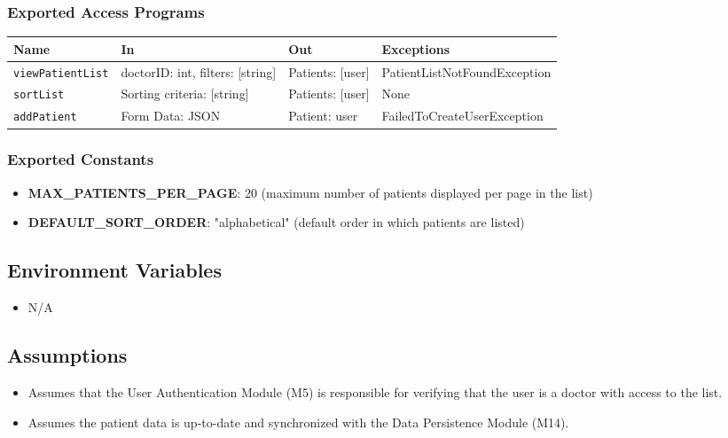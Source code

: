 \documentclass[12pt, titlepage]{article}
\begin{document}
\subsubsection{Exported Access Programs}
\begin{center}
  \renewcommand{\arraystretch}{1.2}
  \begin{tabularx}{\textwidth}{|l|X|X|l|}
    \hline
    \textbf{Name} & \textbf{In} & \textbf{Out} & \textbf{Exceptions} \\
    \hline 
    \texttt{viewPatientList} & doctorID: int, filters: [string] & Patients: [user] & PatientListNotFoundException \\
    \hline
    \texttt{sortList} & Sorting criteria: [string] & Patients: [user] & None \\
    \hline
    \texttt{addPatient} & Form Data: JSON & Patient: user & FailedToCreateUserException \\
    \hline
  \end{tabularx}
\end{center}

\subsubsection{Exported Constants}
\begin{itemize}
\item \textbf{MAX\_PATIENTS\_PER\_PAGE}: 20 (maximum number of patients displayed per page in the list)
\item \textbf{DEFAULT\_SORT\_ORDER}: "alphabetical" (default order in which patients are listed)
\end{itemize}

\subsection{Environment Variables}
\begin{itemize}
\item N/A
\end{itemize}

\subsection{Assumptions}
\begin{itemize}
\item Assumes that the User Authentication Module (M5) is responsible for verifying that the user is a doctor with access to the list.
\item Assumes the patient data is up-to-date and synchronized with the Data Persistence Module (M14).
\end{itemize}
\end{document}
